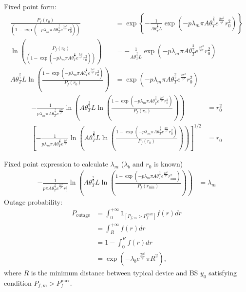 Fixed point form:
\begin{align}
	\frac{ P_{f}(r_{0}) }{ ( 1- \exp(-p \lambda_{m} \pi A \theta_{T}^{\frac{2}{\gamma}} e^{\frac{2\sigma^2}{\gamma^2}}  r_{0}^2 ) )   }  &= \exp\left\lbrace -\frac{1}{ A \theta_{T}^{\frac{2}{\gamma}}  L }  \exp(-p \lambda_{m} \pi A \theta_{T}^{\frac{2}{\gamma}} e^{  \frac{2\sigma^2}{\gamma^2}  } r_{0}^2)  \right\rbrace \nonumber\\ 
	\ln(\frac{ P_{f}(r_{0}) }{ ( 1- \exp(-p \lambda_{m} \pi A \theta_{T}^{\frac{2}{\gamma}} e^{\frac{2\sigma^2}{\gamma^2}}  r_{0}^2 ) )   } ) &= -\frac{1}{ A \theta_{T}^{\frac{2}{\gamma}}  L }  \exp(-p \lambda_{m} \pi A \theta_{T}^{\frac{2}{\gamma}} e^{  \frac{2\sigma^2}{\gamma^2}  } r_{0}^2) \nonumber\\ 
	A \theta_{T}^{\frac{2}{\gamma}}  L \ln\left(   \frac{  1- \exp(-p \lambda_{m} \pi A \theta_{T}^{\frac{2}{\gamma}} e^{\frac{2\sigma^2}{\gamma^2}}  r_{0}^2 )  }{   P_{f}(r_{0})   }   \right)  &=  \exp(-p \lambda_{m} \pi A \theta_{T}^{\frac{2}{\gamma}} e^{  \frac{2\sigma^2}{\gamma^2}  } r_{0}^2)   \nonumber  
\end{align}
\begin{align}
		-\frac{1}{ p \lambda_{m} \pi A \theta_{T}^{\frac{2}{\gamma}} e^{  \frac{2\sigma^2}{\gamma^2}  } }\ln\left(  A \theta_{T}^{\frac{2}{\gamma}}  L \ln\left(   \frac{  1- \exp(-p \lambda_{m} \pi A \theta_{T}^{\frac{2}{\gamma}} e^{\frac{2\sigma^2}{\gamma^2}}  r_{0}^2 )  }{   P_{f}(r_{0})   }   \right)  \right) &=   r_{0}^2    \nonumber\\
		\left[  -\frac{1}{ p \lambda_{m} \pi A \theta_{T}^{\frac{2}{\gamma}} e^{  \frac{2\sigma^2}{\gamma^2}  } }\ln\left(  A \theta_{T}^{\frac{2}{\gamma}}  L \ln\left(   \frac{  1- \exp(-p \lambda_{m} \pi A \theta_{T}^{\frac{2}{\gamma}} e^{\frac{2\sigma^2}{\gamma^2}}  r_{0}^2 )  }{   P_{f}(r_{0})   }   \right)  \right)  \right] ^{1/2}&=   r_{0}    \nonumber
\end{align}

Fixed point expression to calculate $\lambda_m$ ($\lambda_b$ and $r_{0}$ is known)
\begin{align}
-\frac{1}{ p  \pi A \theta_{T}^{\frac{2}{\gamma} } e^{  \frac{2\sigma^2}{\gamma^2}  } r_{0}^2}\ln\left(  A \theta_{T}^{\frac{2}{\gamma}}  L \ln\left(   \frac{  1- \exp(-p \lambda_{m} \pi A \theta_{T}^{\frac{2}{\gamma}} e^{\frac{2\sigma^2}{\gamma^2}}  r_{\text{min}}^2 )  }{   P_{f}(r_{\text{min}})   }   \right)  \right) &=   \lambda_{m}   \nonumber
\end{align}
Outage probability:
\begin{align}
	P_{\text{outage}} &= \int_{0}^{+\infty} \mathds{1}_{\left[ P_{f, m} > P_{f}^{\text{max}}\right] }f(r) dr \nonumber \\
	&= \int_{R}^{+\infty} f(r) dr \nonumber \\
	&= 1 - \int_{ 0 }^{ R } f(r) dr \nonumber \\
	&=  \exp( -\lambda_b  e^{\frac{2\sigma^2}{\gamma^2}} \pi R^2 ),
\end{align}
where $R$ is the minimum distance between typical device and BS $y_0$ satisfying condition $P_{f, m} > P_{f}^{\text{max}}$.
